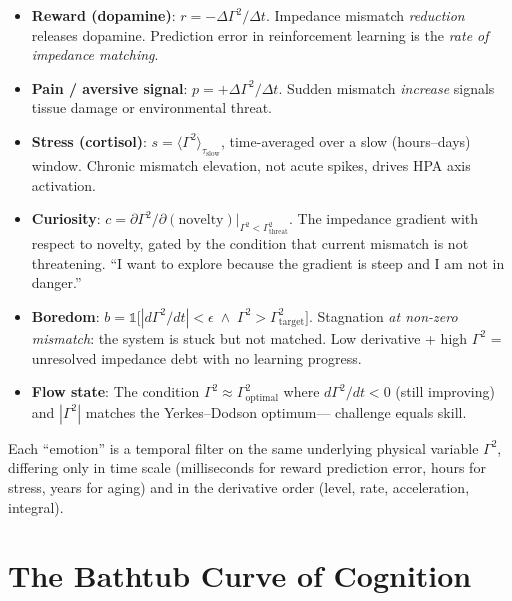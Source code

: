 ﻿\documentclass[aps,pre,twocolumn,superscriptaddress,floatfix]{revtex4-2}
\begin{document}
\begin{itemize}
  \item \textbf{Reward (dopamine)}:
    $r = -\Delta\Gamma^2 / \Delta t$.
    Impedance mismatch \emph{reduction} releases dopamine.
    Prediction error in reinforcement learning is
    the \emph{rate of impedance matching}.

  \item \textbf{Pain / aversive signal}:
    $p = +\Delta\Gamma^2 / \Delta t$.
    Sudden mismatch \emph{increase} signals tissue damage
    or environmental threat.

  \item \textbf{Stress (cortisol)}:
    $s = \langle\Gamma^2\rangle_{\tau_{\mathrm{slow}}}$,
    time-averaged over a slow (hours--days) window.
    Chronic mismatch elevation, not acute spikes,
    drives HPA axis activation.

  \item \textbf{Curiosity}:
    $c = \partial\Gamma^2 / \partial(\text{novelty})
    \big|_{\Gamma^2 < \Gamma^2_{\mathrm{threat}}}$.
    The impedance gradient with respect to novelty,
    gated by the condition that current mismatch is
    not threatening.
    ``I want to explore because the gradient is steep
    and I am not in danger.''

  \item \textbf{Boredom}:
    $b = \mathbb{1}\!\bigl[
      |d\Gamma^2/dt| < \epsilon
      \;\wedge\;
      \Gamma^2 > \Gamma^2_{\mathrm{target}}
    \bigr]$.
    Stagnation \emph{at non-zero mismatch}:
    the system is stuck but not matched.
    Low derivative + high $\Gamma^2$ = unresolved
    impedance debt with no learning progress.

  \item \textbf{Flow state}:
    The condition $\Gamma^2 \approx \Gamma^2_{\mathrm{optimal}}$
    where $d\Gamma^2/dt < 0$ (still improving)
    and $|\Gamma^2|$ matches the Yerkes--Dodson optimum---
    challenge equals skill.
\end{itemize}

Each ``emotion'' is a temporal filter on the same
underlying physical variable $\Gamma^2$, differing
only in time scale (milliseconds for reward prediction
error, hours for stress, years for aging)
and in the derivative order (level, rate, acceleration,
integral).


\section{The Bathtub Curve of Cognition}
\label{sec:bathtub}
\end{document}
